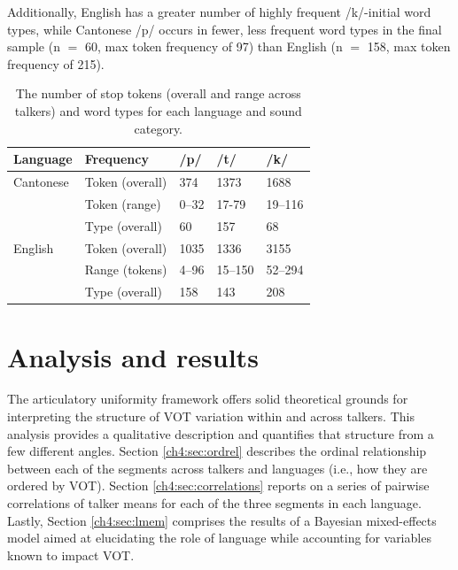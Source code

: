 Additionally, English has a greater number of highly frequent /k/-initial word types, while Cantonese /p/ occurs in fewer, less frequent word types in the final sample (n $=$ 60, max token frequency of 97) than English (n $=$ 158, max token frequency of 215). 

\begin{table}[htb]
  \caption{The number of stop tokens (overall and range across talkers) and word types for each language and sound category.}
  \label{ch3:tab:counts}
  \centering
  \begin{tabular}{lllll}
    \toprule
    \textbf{Language} & \textbf{Frequency} & \textbf{/p/} & \textbf{/t/} & \textbf{/k/} \\
    \midrule
    Cantonese         & Token (overall) & 374      & 1373         & 1688    \\
                      & Token (range)   & 0--32    & 17-79        & 19--116 \\
                      & Type (overall)  & 60       & 157          & 68      \\
    \midrule
    English           & Token (overall) & 1035     & 1336         & 3155   \\
                      & Range (tokens)  & 4--96    & 15--150      & 52--294 \\
                      & Type  (overall) & 158      & 143          & 208     \\
    \bottomrule     
  \end{tabular}
\end{table}

\section{Analysis and results}\label{ch4:sec:analysisresults}

The articulatory uniformity framework offers solid theoretical grounds for interpreting the structure of VOT variation within and across talkers. This analysis provides a qualitative description and quantifies that structure from a few different angles. Section \ref{ch4:sec:ordrel} describes the ordinal relationship between each of the segments across talkers and languages (i.e., how they are ordered by VOT). Section \ref{ch4:sec:correlations} reports on a series of pairwise correlations of talker means for each of the three segments in each language. Lastly, Section \ref{ch4:sec:lmem} comprises the results of a Bayesian mixed-effects model aimed at elucidating the role of language while accounting for variables known to impact VOT.

